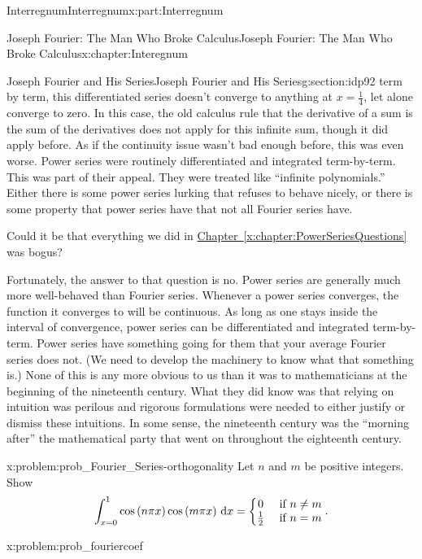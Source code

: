 \begin{partptx}{Interregnum}{}{Interregnum}{}{}{x:part:Interregnum}
\begin{chapterptx}{Joseph Fourier: The Man Who Broke Calculus}{}{Joseph Fourier: The Man Who Broke Calculus}{}{}{x:chapter:Interegnum}
\begin{sectionptx}{Joseph Fourier and His Series}{}{Joseph Fourier and His Series}{}{}{g:section:idp92}
			term by term, this differentiated series doesn't converge to anything at \(x=\frac{1}{4}\), let alone converge to zero. In this case, the old calculus rule that the derivative of a sum is the sum of the derivatives does not apply for this infinite sum, though it did apply before. As if the continuity issue wasn't bad enough before, this was even worse. Power series were routinely differentiated and integrated term-by-term. This was part of their appeal. They were treated like ``infinite polynomials.'' Either there is some power series lurking that refuses to behave nicely, or there is some property that power series have that not all Fourier series have.%
			\par
			Could it be that everything we did in \hyperref[x:chapter:PowerSeriesQuestions]{Chapter~{\xreffont\ref{x:chapter:PowerSeriesQuestions}}} was bogus?%
			\par
			Fortunately, the answer to that question is no. Power series are generally much more well-behaved than Fourier series. Whenever a power series converges, the function it converges to will be continuous. As long as one stays inside the interval of convergence, power series can be differentiated and integrated term-by-term. Power series have something going for them that your average Fourier series does not. (We need to develop the machinery to know what that something is.) None of this is any more obvious to us than it was to mathematicians at the beginning of the nineteenth century. What they did know was that relying on intuition was perilous and rigorous formulations were needed to either justify or dismiss these intuitions. In some sense, the nineteenth century was the ``morning after'' the mathematical party that went on throughout the eighteenth century.%
			\begin{problem}{}{x:problem:prob_Fourier_Series-orthogonality}%
				 Let \(n\) and \(m\) be positive integers. Show%
				\begin{equation*}
					\int_{x=0}^1\cos\left(n\pi x\right)\cos\left(m\pi x\right)\,{\rm d} x=\left\{ \begin{matrix}0& \text{ if } n\neq m\\ \frac{1}{2}& \text{ if } n=m \end{matrix} \right.\text{.}
				\end{equation*}
			\end{problem}
			\begin{problem}{}{x:problem:prob_fouriercoef}%

\end{problem}
\end{sectionptx}
\end{chapterptx}
\end{partptx}
